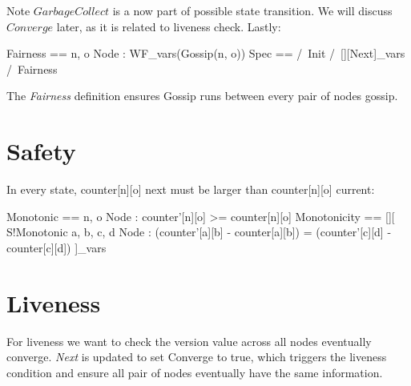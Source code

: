 \documentclass{report}
\begin{document}
Note $GarbageCollect$ is a now part of possible state transition. We will
discuss $Converge$ later, as it is related to liveness check. Lastly:\newline

\begin{tla}
Fairness == \A n, o \in Node : WF_vars(Gossip(n, o))
Spec ==
    /\ Init
    /\ [][Next]_vars
    /\ Fairness
\end{tla}
\begin{tlatex}
%
%
%
%
\end{tlatex}
\newline

The \textit{Fairness} definition ensures Gossip runs between every pair of nodes
gossip.

\section{Safety}

In every state, counter[n][o] next must be larger than counter[n][o] current:\newline

\begin{tla}
Monotonic == \A n, o \in Node : counter'[n][o] >= counter[n][o] 
Monotonicity == [][
    \/ S!Monotonic
    \/ \A a, b, c, d \in Node :
        (counter'[a][b] - counter[a][b]) = (counter'[c][d] - counter[c][d])
]_vars
\end{tla}
\begin{tlatex}
\@x{ Monotonicity \.{\defeq} {\Box} [}%
%
%
\@x{ ]_{ vars}}%
\end{tlatex}

\section{Liveness}

For liveness we want to check the version value across all nodes eventually
converge. \textit{Next} is updated to set Converge to true, which triggers the
liveness condition and ensure all pair of nodes eventually have the same
information. \newline
\end{document}
